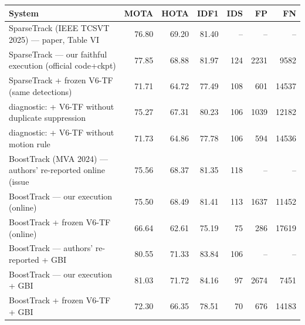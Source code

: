 \begin{tabular}{lrrrrrr}
\toprule
System & MOTA & HOTA & IDF1 & IDS & FP & FN \\
\midrule
SparseTrack (IEEE TCSVT 2025) — paper, Table VI & 76.80 & 69.20 & 81.40 & – & – & – \\
SparseTrack — our faithful execution (official code+ckpt) & 77.85 & 68.88 & 81.97 & 124 & 2231 & 9582 \\
SparseTrack + frozen V6-TF (same detections) & 71.71 & 64.72 & 77.49 & 108 & 601 & 14537 \\
  diagnostic: + V6-TF without duplicate suppression & 75.27 & 67.31 & 80.23 & 106 & 1039 & 12182 \\
  diagnostic: + V6-TF without motion rule & 71.73 & 64.86 & 77.78 & 106 & 594 & 14536 \\
BoostTrack (MVA 2024) — authors' re-reported online (issue #8) & 75.56 & 68.37 & 81.35 & 118 & – & – \\
BoostTrack — our execution (online) & 75.50 & 68.49 & 81.41 & 113 & 1637 & 11452 \\
BoostTrack + frozen V6-TF (online) & 66.64 & 62.61 & 75.19 & 75 & 286 & 17619 \\
BoostTrack — authors' re-reported + GBI & 80.55 & 71.33 & 83.84 & 106 & – & – \\
BoostTrack — our execution + GBI & 81.03 & 71.72 & 84.16 & 97 & 2674 & 7451 \\
BoostTrack + frozen V6-TF + GBI & 72.30 & 66.35 & 78.51 & 70 & 676 & 14183 \\
\bottomrule
\end{tabular}
